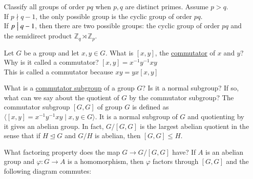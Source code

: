 \documentclass[avery5371,grid]{flashcards}
\newcommand{\Z}{\mathbb{Z}}
\newcommand{\divides}{\bigm|}
\newcommand{\inv}{^{-1}}
\let \phi \varphi
\begin{document}
\begin{flashcard}[Groups]{Classify all groups of order $pq$ when $p,q$ are distinct primes.}
 Assume $p > q$. \\
 
 If $p \nmid q-1$, the only possible group is the cyclic group of order $pq$.\\
 
 If $p \divides q-1$, then there are two possible groups: the cyclic group of order $pq$ and the semidirect product $\Z_q \rtimes \Z_p$.
\end{flashcard}

\begin{flashcard}[Groups]{Let $G$ be a group and let $x,y \in G$. What is $[x,y]$, the \underline{commutator} of $x$ and $y$? Why is it called a commutator?}
 $[x,y] = x \inv y \inv x y$\\
 
 This is called a commutator because $xy = yx[x,y]$
\end{flashcard}

\begin{flashcard}[Groups]{What is a \underline{commutator subgroup} of a group $G$? Is it a normal subgroup? If so, what can we say about the quotient of $G$ by the commutator subgroup?}
 The commutator subgroup $[G,G]$ of group $G$ is defined as $\langle [x,y] = x \inv y \inv x y \mid x,y \in G \rangle$. It is a normal subgroup of $G$ and quotienting by it gives an abelian group. In fact, $G/[G,G]$ is the largest abelian quotient in the sense that if $H \trianglelefteq G$ and $G/H$ is abelian, then $[G,G] \leq H$.
\end{flashcard}

\begin{flashcard}[Groups]{What factoring property does the map $G \to G/[G,G]$ have?}
 If $A$ is an abelian group and $\phi: G \to A$ is a homomorphism, then $\phi$ factors through $[G,G]$ and the following diagram commutes:
 \begin{center}
 \end{center}
\end{flashcard}
\end{document}
